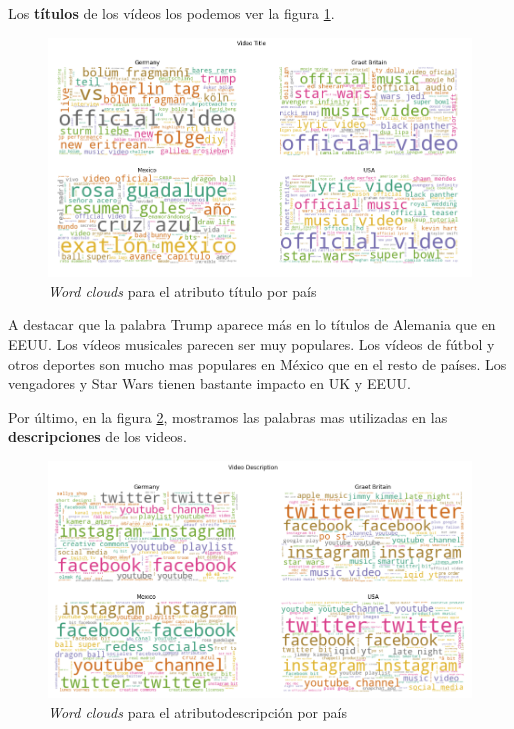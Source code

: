 \documentclass[a4paper,12pt]{article}
\begin{document}
Los \textbf{t\'itulos} de los v\'ideos los podemos ver la figura \ref{fig:colud_3}.  


\begin{figure}[h!]
\centering
\includegraphics[width=13cm]{wordcloud_title.png}
\caption{{\itshape Word clouds} para el atributo t\'itulo por pa\'is}
\label{fig:colud_3}
\end{figure}

A destacar que la palabra Trump aparece m\'as en lo t\'itulos de Alemania que en EEUU. Los v\'ideos musicales parecen ser muy populares. Los v\'ideos de f\'utbol y otros deportes son mucho mas populares en M\'exico que en el resto de pa\'ises. Los vengadores y Star Wars tienen bastante impacto en UK y EEUU.

Por \'ultimo, en la figura \ref{fig:colud_4},  mostramos las palabras mas utilizadas en las \textbf{descripciones} de los videos.

\begin{figure}[h!]
\centering

\includegraphics[width=13cm]{wordcould_desc.png}
\caption{{\itshape Word clouds} para el atributodescripci\'on  por pa\'is}
\label{fig:colud_4}
\end{figure}
\end{document}
